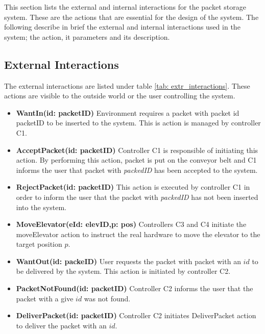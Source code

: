 \label{sec:ext_interactions}
This section lists the external and internal interactions for the packet storage system. These are the actions that are essential for the design of the system. The following describe in brief the external and internal interactions used in the system; the action, it parameters and its description.

\subsection*{External Interactions} The external interactions are listed under table \ref{tab: extr_interactions}. These actions are visible to the outside world or the user controlling the system.

\begin{itemize}
\item \textbf{WantIn(id: packetID)}
Environment requires a packet with packet id packetID to be inserted to the system. This is action is managed by controller C1.

\item \textbf{AcceptPacket(id: packetID)}
Controller C1 is responsible of initiating this action. By performing this action, packet is put on the conveyor belt and C1 informs the user that packet with \textit{packedID} has been accepted to the system.

\item \textbf{RejectPacket(id: packetID)}
This action is executed by controller C1 in order to inform the user that the packet with \textit{packedID} has not been inserted into the system.

\item \textbf{MoveElevator(eId: elevID,p: pos)}
Controllers C3 and C4 initiate the moveElevator action to instruct the real hardware to move the elevator to the target position $p$.

\item \textbf{WantOut(id: packeID)}
User requests the packet with packet with an $id$ to be delivered by the system. This action is initiated by controller C2.

\item \textbf{PacketNotFound(id: packetID)}
Controller C2 informs the user that the packet with a give $id$ was not found.

\item \textbf{DeliverPacket(id: packetID)}
Controller C2 initiates DeliverPacket action to deliver the packet with an $id$.


\end{itemize}
